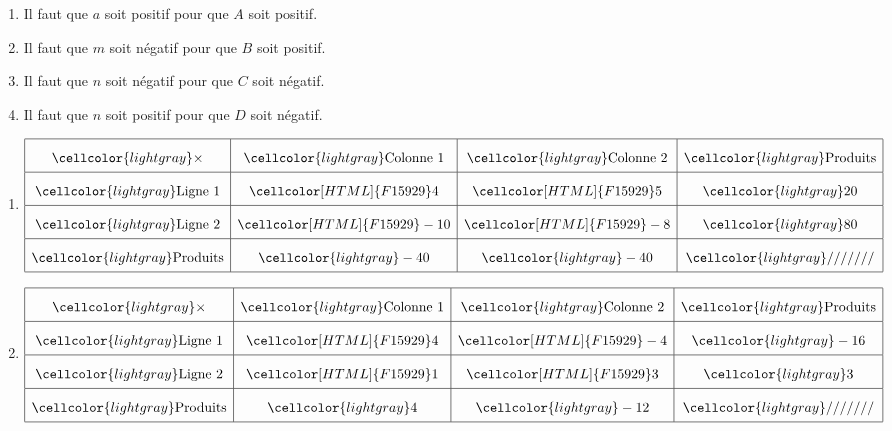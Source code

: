 \begin{Correction}
\begin{EXO}{}{}

\begin{enumerate}[itemsep=1em]
	\item Il faut que $ a $ soit positif pour que $A$ soit positif.
	\item Il faut que $ m $ soit négatif pour que $B$ soit positif.
	\item Il faut que $ n $ soit négatif pour que $C$ soit négatif.
	\item Il faut que $ n $ soit positif pour que $D$ soit négatif.
\end{enumerate}
\end{EXO}

\begin{EXO}{}{}

\begin{enumerate}[itemsep=1em]
	\item $\renewcommand{\arraystretch}{2}
\begin{array}{|c|c|c|c|}
\hline
\cellcolor{lightgray} \times & \cellcolor{lightgray} \text{Colonne 1} & \cellcolor{lightgray} \text{Colonne 2} & \cellcolor{lightgray} \text{Produits}\\
\hline
\cellcolor{lightgray} \text{Ligne 1} & \cellcolor[HTML]{F15929} 4 & \cellcolor[HTML]{F15929} 5 & \cellcolor{lightgray}20\\
\hline
 \cellcolor{lightgray} \text{Ligne 2} & \cellcolor[HTML]{F15929} -10 & \cellcolor[HTML]{F15929} -8 & \cellcolor{lightgray}80\\
\hline
 \cellcolor{lightgray} \text{Produits} & \cellcolor{lightgray}-40 & \cellcolor{lightgray}-40 & \cellcolor{lightgray}///////\\
\hline
 \end{array}
\renewcommand{\arraystretch}{1}$

	\item $\renewcommand{\arraystretch}{2}
\begin{array}{|c|c|c|c|}
\hline
\cellcolor{lightgray} \times & \cellcolor{lightgray} \text{Colonne 1} & \cellcolor{lightgray} \text{Colonne 2} & \cellcolor{lightgray} \text{Produits}\\
\hline
\cellcolor{lightgray} \text{Ligne 1} & \cellcolor[HTML]{F15929} 4 & \cellcolor[HTML]{F15929} -4 & \cellcolor{lightgray}-16\\
\hline
 \cellcolor{lightgray} \text{Ligne 2} & \cellcolor[HTML]{F15929} 1 & \cellcolor[HTML]{F15929} 3 & \cellcolor{lightgray}3\\
\hline
 \cellcolor{lightgray} \text{Produits} & \cellcolor{lightgray}4 & \cellcolor{lightgray}-12 & \cellcolor{lightgray}///////\\
\hline
 \end{array}
\renewcommand{\arraystretch}{1}$


\end{enumerate}
\end{EXO}
\end{Correction}
